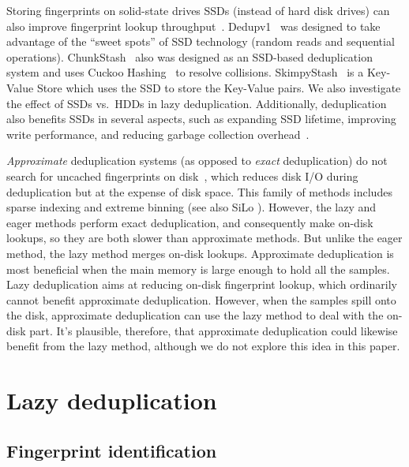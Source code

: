 \documentclass[prodmode,acmtecs]{acmsmall}
\begin{document}
Storing fingerprints on solid-state drives SSDs (instead of hard disk drives) can also improve fingerprint lookup throughput~\cite{kim2011rethinking,Kim2012SSD}.  Dedupv1~\cite{meister2010dedupv1} was designed to take advantage of the ``sweet spots'' of SSD technology (random reads and sequential operations).  ChunkStash~\cite{debnath2010chunkstash} also was designed as an SSD-based deduplication system and uses Cuckoo Hashing~\cite{pagh2001cuckoo} to resolve collisions.  SkimpyStash~\cite{debnath2011skimpystash} is a Key-Value Store which uses the SSD to store the Key-Value pairs.  We also investigate the effect of SSDs vs.\ HDDs in lazy deduplication.  Additionally, deduplication also benefits SSDs in several aspects, such as expanding SSD lifetime, improving write performance, and reducing garbage collection overhead~\cite{Kim2012Deduplication}.


\emph{Approximate} deduplication systems (as opposed to \emph{exact} deduplication) do not search for uncached fingerprints on disk~\cite{lillibridge2009sparse,bhagwat2009extreme,xia2011silo}, which reduces disk I/O during deduplication but at the expense of disk space. This family of methods includes sparse indexing \cite{lillibridge2009sparse} and extreme binning \cite{bhagwat2009extreme} (see also SiLo \cite{xia2011silo}).  However, the lazy and eager methods perform exact deduplication, and consequently make on-disk lookups, so they are both slower than approximate methods.  But unlike the eager method, the lazy method merges on-disk lookups. Approximate deduplication is most beneficial when the main memory is large enough to hold all the samples. Lazy deduplication aims at reducing on-disk fingerprint lookup, which ordinarily cannot benefit approximate deduplication. However, when the samples spill onto the disk, approximate deduplication can use the lazy method to deal with the on-disk part. It's plausible, therefore, that approximate deduplication could likewise benefit from the lazy method, although we do not explore this idea in this paper.


\section{Lazy deduplication}
\label{sec:idea}

\subsection{Fingerprint identification}
\end{document}
